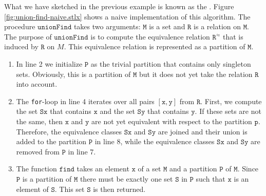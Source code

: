 What we have sketched in the previous example is known as the .
Figure \ref{fig:union-find-naive.stlx} shows a naive implementation of this algorithm.  The
procedure $\mathtt{unionFind}$ takes two arguments: $\mathtt{M}$ is a set and $\mathtt{R}$ is a relation
on $\mathtt{M}$.  The purpose of $\mathtt{unionFind}$ is to compute the equivalence relation $\mathtt{R}^\approx$
that is induced by $\mathtt{R}$ on $M$.  This equivalence relation is represented as a partition of $\mathtt{M}$.
\begin{enumerate}
\item In line 2 we initialize $\mathtt{P}$ as the trivial partition that contains only singleton
      sets.  Obviously, this is a partition of $\mathtt{M}$ but it does not yet take the
      relation $\mathtt{R}$ into account.
\item The \texttt{for}-loop in line 4 iterates over all pairs $[\mathtt{x},\mathtt{y}]$ from $\mathtt{R}$.
      First, we compute the set $\mathtt{Sx}$ that contains $\mathtt{x}$ and the set $\mathtt{Sy}$ that
      contains $\mathtt{y}$.  If these sets are not the same, then $\mathtt{x}$ and $\mathtt{y}$ are not
      yet equivalent with respect to the partition $\mathtt{p}$.  Therefore, the equivalence classes
      $\mathtt{Sx}$ and $\mathtt{Sy}$ are joined and their union is added to the partition 
      $\mathtt{P}$ in line 8, while the equivalence classes $\mathtt{Sx}$ and $\mathtt{Sy}$ are
      removed from $\mathtt{P}$ in line 7.
\item The function $\mathtt{find}$ takes an element $\mathtt{x}$ of a set $\mathtt{M}$ and a partition
      $\mathtt{P}$ of $\mathtt{M}$.  Since $\mathtt{P}$ is a partition of $\mathtt{M}$ there must be exactly
      one set $\mathtt{S}$ in $\mathtt{P}$ such that $\mathtt{x}$ is an element of $\mathtt{S}$.  This set
      $\mathtt{S}$ is then returned.
\end{enumerate}

